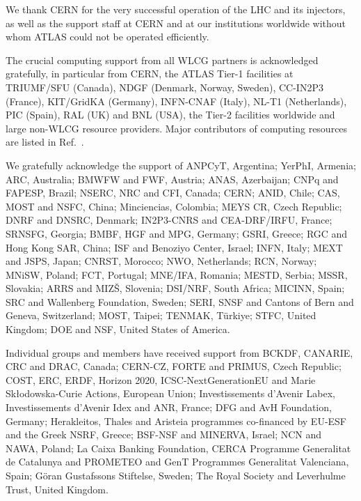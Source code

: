  
 
We thank CERN for the very successful operation of the LHC and its injectors, as well as the support staff at
CERN and at our institutions worldwide without whom ATLAS could not be operated efficiently.
 
The crucial computing support from all WLCG partners is acknowledged gratefully, in particular from CERN, the ATLAS Tier-1 facilities at TRIUMF/SFU (Canada), NDGF (Denmark, Norway, Sweden), CC-IN2P3 (France), KIT/GridKA (Germany), INFN-CNAF (Italy), NL-T1 (Netherlands), PIC (Spain), RAL (UK) and BNL (USA), the Tier-2 facilities worldwide and large non-WLCG resource providers. Major contributors of computing resources are listed in Ref.~\cite{ATL-SOFT-PUB-2023-001}.
 
We gratefully acknowledge the support of ANPCyT, Argentina; YerPhI, Armenia; ARC, Australia; BMWFW and FWF, Austria; ANAS, Azerbaijan; CNPq and FAPESP, Brazil; NSERC, NRC and CFI, Canada; CERN; ANID, Chile; CAS, MOST and NSFC, China; Minciencias, Colombia; MEYS CR, Czech Republic; DNRF and DNSRC, Denmark; IN2P3-CNRS and CEA-DRF/IRFU, France; SRNSFG, Georgia; BMBF, HGF and MPG, Germany; GSRI, Greece; RGC and Hong Kong SAR, China; ISF and Benoziyo Center, Israel; INFN, Italy; MEXT and JSPS, Japan; CNRST, Morocco; NWO, Netherlands; RCN, Norway; MNiSW, Poland; FCT, Portugal; MNE/IFA, Romania; MESTD, Serbia; MSSR, Slovakia; ARRS and MIZ\v{S}, Slovenia; DSI/NRF, South Africa; MICINN, Spain; SRC and Wallenberg Foundation, Sweden; SERI, SNSF and Cantons of Bern and Geneva, Switzerland; MOST, Taipei; TENMAK, T\"urkiye; STFC, United Kingdom; DOE and NSF, United States of America.
 
Individual groups and members have received support from BCKDF, CANARIE, CRC and DRAC, Canada; CERN-CZ, FORTE and PRIMUS, Czech Republic; COST, ERC, ERDF, Horizon 2020, ICSC-NextGenerationEU and Marie Sk{\l}odowska-Curie Actions, European Union; Investissements d'Avenir Labex, Investissements d'Avenir Idex and ANR, France; DFG and AvH Foundation, Germany; Herakleitos, Thales and Aristeia programmes co-financed by EU-ESF and the Greek NSRF, Greece; BSF-NSF and MINERVA, Israel; NCN and NAWA, Poland; La Caixa Banking Foundation, CERCA Programme Generalitat de Catalunya and PROMETEO and GenT Programmes Generalitat Valenciana, Spain; G\"{o}ran Gustafssons Stiftelse, Sweden; The Royal Society and Leverhulme Trust, United Kingdom.
 
